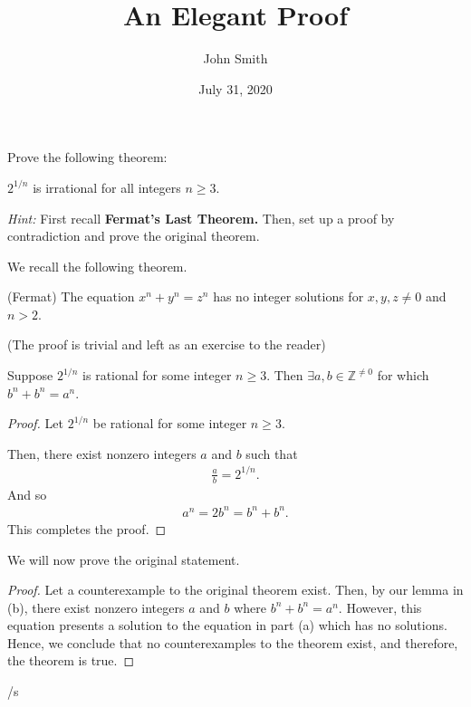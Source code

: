 \documentclass{\classpath}
\begin{document}
\title{An Elegant Proof}
\author{John Smith}
\date{July 31, 2020}

\maketitle

 Prove the following theorem:
\begin{theorem} 
    \(2^{1/n}\) is irrational for all integers \(n \geq 3\).
\end{theorem}

\textit{Hint:} 
First recall \textbf{Fermat's Last Theorem.} 
Then, set up a proof by contradiction and prove the original theorem.

\alphnum 
    We recall the following theorem.

    \begin{theorem}\label{fermat}
        (Fermat) The equation \(x^n + y^n = z^n\) has no integer solutions for \(x,y,z \neq 0\) and \(n > 2\).
    \end{theorem}
        
    (The proof is trivial and left as an exercise to the reader)

\alphnum
    \begin{lemma}\label{lem}
        Suppose \(2^{1/n}\) is rational for some integer \(n \geq 3\). 
        Then \(\exists a, b \in \mathbb{Z}^{\neq 0}\) for which \(b^n + b^n = a^n\).
    \end{lemma}
    \begin{proof}
        Let \(2^{1/n}\) be rational for some integer \(n \geq 3\).

        Then, there exist nonzero integers \(a\) and \(b\) such that 
        \begin{align*}
            \frac{a}{b} = 2^{1/n}.
        \end{align*}
        And so
        \begin{align*}
            a^n = 2b^n = b^n + b^n.
        \end{align*}
        This completes the proof.
    \end{proof}

\alphnum
    We will now prove the original statement.

    \begin{proof}
        Let a counterexample to the original theorem exist. Then, by our lemma in (b), 
        there exist nonzero integers \(a\) and \(b\) where \(b^n + b^n = a^n\).
        However, this equation presents a solution to the equation in part (a) which has no solutions.
        Hence, we conclude that no counterexamples to the theorem exist, and therefore, the theorem is true. 
    \end{proof}

{\tiny /s}
\end{document}
